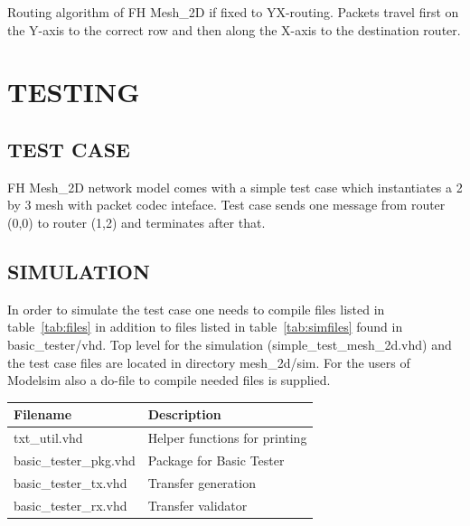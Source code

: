 \documentclass[a4paper,10pt,oneside,final]{article}
\def\deftablecolora{blue!10!white}
\def\deftablecolorb{white}
\begin{document}
Routing algorithm of FH Mesh\_2D if fixed to YX-routing. Packets travel
first on the Y-axis to the correct row and then along the X-axis to
the destination router.

\newpage
\section{TESTING}

\subsection{TEST CASE}

FH Mesh\_2D network model comes with a simple test case which instantiates
a 2 by 3 mesh with packet codec inteface. Test case sends one message
from router (0,0) to router (1,2) and terminates after that.

\subsection{SIMULATION}

In order to simulate the test case one needs to compile files listed
in table~\ref{tab:files} in addition to files listed in
table~\ref{tab:simfiles} found in basic\_tester/vhd. Top level for the
simulation (simple\_test\_mesh\_2d.vhd) and the test case files are
located in directory mesh\_2d/sim. For the users of Modelsim also a
do-file to compile needed files is supplied.


\begin{center}
  \rowcolors{3}{\deftablecolora}{\deftablecolorb}

  \label{tab:simfiles}
  \begin{tabularx}{\textwidth}{|lX|}
    \hline
    Filename   & Description\\
    \hline
    txt\_util.vhd          & Helper functions for printing\\
    basic\_tester\_pkg.vhd & Package for Basic Tester\\
    basic\_tester\_tx.vhd  & Transfer generation\\
    basic\_tester\_rx.vhd  & Transfer validator\\
    \hline
  \end{tabularx}  
\end{center}
\end{document}
